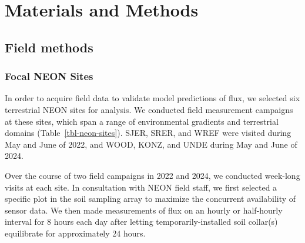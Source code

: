 \documentclass[
  letterpaper,
  DIV=11,
  numbers=noendperiod]{scrartcl}
\begin{document}
\section{Materials and Methods}\label{materials-and-methods}

\subsection{Field methods}\label{field-methods}

\subsubsection{Focal NEON Sites}\label{focal-neon-sites}

In order to acquire field data to validate model predictions of flux, we
selected six terrestrial NEON sites for analysis. We conducted field
measurement campaigns at these sites, which span a range of
environmental gradients and terrestrial domains
(Table~\ref{tbl-neon-sites}). SJER, SRER, and WREF were visited during
May and June of 2022, and WOOD, KONZ, and UNDE during May and June of
2024.

Over the course of two field campaigns in 2022 and 2024, we conducted
week-long visits at each site. In consultation with NEON field staff, we
first selected a specific plot in the soil sampling array to maximize
the concurrent availability of sensor data. We then made measurements of
flux on an hourly or half-hourly interval for 8 hours each day after
letting temporarily-installed soil collar(s) equilibrate for
approximately 24 hours.

\scriptsize
\end{document}
